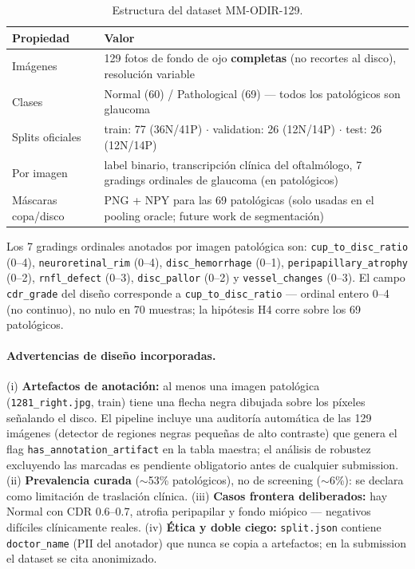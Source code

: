 \documentclass[12pt,a4paper]{article}
\begin{document}
\begin{table}[H]
\centering
\small
\caption{Estructura del dataset MM-ODIR-129.}
\label{tab:dataset}
\begin{tabularx}{\textwidth}{lX}
\toprule
\textbf{Propiedad} & \textbf{Valor} \\
\midrule
Imágenes & 129 fotos de fondo de ojo \textbf{completas} (no recortes al disco), resolución variable \\
Clases & Normal (60) / Pathological (69) --- todos los patológicos son glaucoma \\
Splits oficiales & train: 77 (36N/41P) $\cdot$ validation: 26 (12N/14P) $\cdot$ test: 26 (12N/14P) \\
Por imagen & label binario, transcripción clínica del oftalmólogo, 7 gradings ordinales de glaucoma (en patológicos) \\
Máscaras copa/disco & PNG + NPY para las 69 patológicas (solo usadas en el pooling oracle; future work de segmentación) \\
\bottomrule
\end{tabularx}
\end{table}

Los 7 gradings ordinales anotados por imagen patológica son:
\texttt{cup\_to\_disc\_ratio} (0--4), \texttt{neuroretinal\_rim} (0--4),
\texttt{disc\_hemorrhage} (0--1), \texttt{peripapillary\_atrophy} (0--2),
\texttt{rnfl\_defect} (0--3), \texttt{disc\_pallor} (0--2) y
\texttt{vessel\_changes} (0--3). El campo \texttt{cdr\_grade} del diseño
corresponde a \texttt{cup\_to\_disc\_ratio} --- ordinal entero 0--4 (no
continuo), no nulo en 70 muestras; la hipótesis H4 corre sobre los 69
patológicos.

\paragraph{Advertencias de diseño incorporadas.}
(i) \textbf{Artefactos de anotación:} al menos una imagen patológica
(\texttt{1281\_right.jpg}, train) tiene una flecha negra dibujada sobre
los píxeles señalando el disco. El pipeline incluye una auditoría
automática de las 129 imágenes (detector de regiones negras pequeñas de
alto contraste) que genera el flag \texttt{has\_annotation\_artifact} en
la tabla maestra; el análisis de robustez excluyendo las marcadas es
pendiente obligatorio antes de cualquier submission. (ii)
\textbf{Prevalencia curada} ($\sim$53\% patológicos), no de screening
($\sim$6\%): se declara como limitación de traslación clínica. (iii)
\textbf{Casos frontera deliberados:} hay Normal con CDR 0.6--0.7, atrofia
peripapilar y fondo miópico --- negativos difíciles clínicamente reales.
(iv) \textbf{Ética y doble ciego:} \texttt{split.json} contiene
\texttt{doctor\_name} (PII del anotador) que nunca se copia a artefactos;
en la submission el dataset se cita anonimizado.
\end{document}
